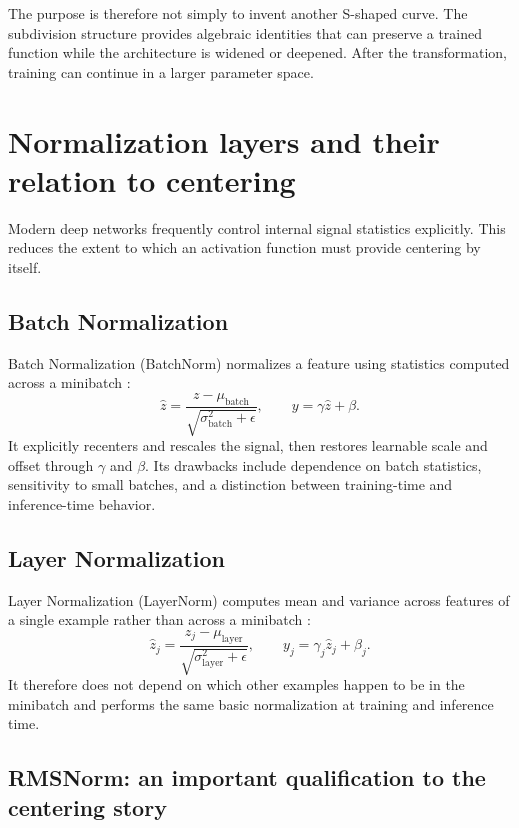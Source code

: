 \documentclass[11pt]{article}
\begin{document}
The purpose is therefore not simply to invent another S-shaped curve.  The subdivision structure provides algebraic identities that can preserve a trained function while the architecture is widened or deepened.  After the transformation, training can continue in a larger parameter space.

\section{Normalization layers and their relation to centering}
\label{app:norm}

Modern deep networks frequently control internal signal statistics explicitly.  This reduces the extent to which an activation function must provide centering by itself.

\subsection{Batch Normalization}

Batch Normalization (BatchNorm) normalizes a feature using statistics computed across a minibatch \cite{ioffe2015}:
\begin{equation}
  \hat z=\frac{z-\mu_{\mathrm{batch}}}{\sqrt{\sigma^2_{\mathrm{batch}}+\epsilon}},
  \qquad
  y=\gamma\hat z+\beta.
\end{equation}
It explicitly recenters and rescales the signal, then restores learnable scale and offset through \(\gamma\) and \(\beta\).  Its drawbacks include dependence on batch statistics, sensitivity to small batches, and a distinction between training-time and inference-time behavior.

\subsection{Layer Normalization}

Layer Normalization (LayerNorm) computes mean and variance across features of a single example rather than across a minibatch \cite{ba2016}:
\begin{equation}
  \hat z_j=\frac{z_j-\mu_{\mathrm{layer}}}{\sqrt{\sigma^2_{\mathrm{layer}}+\epsilon}},
  \qquad
  y_j=\gamma_j\hat z_j+\beta_j.
\end{equation}
It therefore does not depend on which other examples happen to be in the minibatch and performs the same basic normalization at training and inference time.

\subsection{RMSNorm: an important qualification to the centering story}
\end{document}
